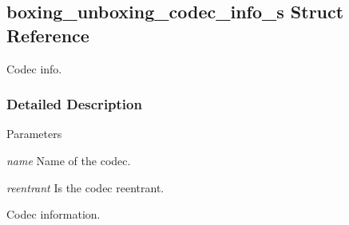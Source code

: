 \hypertarget{structboxing__unboxing__codec__info__s}{
\subsection{boxing\_\-unboxing\_\-codec\_\-info\_\-s Struct Reference}
\label{structboxing__unboxing__codec__info__s}
}


Codec info.  


\subsubsection{Detailed Description}

\begin{DoxyParams}{Parameters}
\item[{\em name}]Name of the codec. \item[{\em reentrant}]Is the codec reentrant.\end{DoxyParams}
Codec information. 